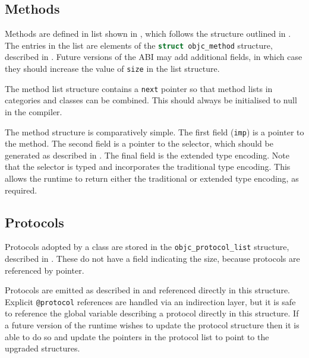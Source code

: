 \documentclass[a4paper]{report}
\newcommand{\ccode}[1]{\lstinline[language={C}]{#1}}
\newcommand{\objc}[1]{\lstinline[language={[Objective]C}]{#1}}
\newcommand{\inccode}[4]{
{
	 }}
	]{../#1}
}
}
\begin{document}
\subsection{Methods}


Methods are defined in list shown in , which follows the structure outlined in .
The entries in the list are elements of the \ccode{struct objc_method} structure, described in .
Future versions of the ABI may add additional fields, in which case they should increase the value of \ccode{size} in the list structure.

The method list structure contains a \ccode{next} pointer so that method lists in categories and classes can be combined.
This should always be initialised to null in the compiler.

\inccode{method.h}{methodlist}{objc_method_list}{The method structure.}
\inccode{method.h}{method}{objc_method}{The method structure.}

The method structure is comparatively simple.
The first field (\ccode{imp}) is a pointer to the method.
The second field is a pointer to the selector, which should be generated as described in .
The final field is the extended type encoding.
Note that the selector is typed and incorporates the traditional type encoding.
This allows the runtime to return either the traditional or extended type encoding, as required.

\subsection{Protocols}
\label{sec:protocollist}

Protocols adopted by a class are stored in the \ccode{objc_protocol_list} structure, described in .
These do not have a field indicating the size, because protocols are referenced by pointer.

\inccode{protocol.h}{protocollist}{objc_protocol_list}{The protocol structure.}

Protocols are emitted as described in  and referenced directly in this structure.
Explicit \objc{@protocol} references are handled via an indirection layer, but it is safe to reference the global variable describing a protocol directly in this structure.
If a future version of the runtime wishes to update the protocol structure then it is able to do so and update the pointers in the protocol list to point to the upgraded structures.
\end{document}
